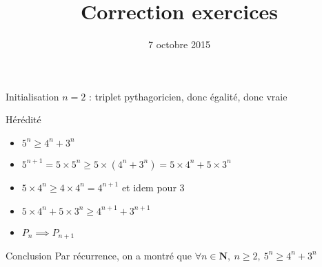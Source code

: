 \documentclass[12pt,french]{beamer}
\title{Correction exercices}
\date{7 octobre 2015}
\newcommand{\N}{\mathbf{N}}
\begin{document}
\begin{frame}
  \maketitle
\end{frame}

\begin{frame}
  \begin{block}{Initialisation}
    $n = 2$ : triplet pythagoricien, donc égalité, donc vraie
  \end{block}
  \begin{block}{Hérédité}
    \begin{itemize}
      \item $5^n \geqslant 4^n + 3^n$
      \item $5^{n+1} = 5\times 5^n \geqslant 5\times (4^n + 3^n) =
        5\times 4^n + 5\times 3^n$
      \item $5\times 4^n \geqslant 4\times 4^n = 4^{n+1}$ et idem pour 3
      \item $5\times 4^n + 5\times 3^n \geqslant 4^{n+1} + 3^{n+1}$
      \item $P_n \implies P_{n+1}$
    \end{itemize}
  \end{block}
  \begin{block}{Conclusion}
    Par récurrence, on a montré que $\forall n\in\N,\ n\geqslant 2,\ 5^n
    \geqslant 4^n + 3^n$
  \end{block}
\end{frame}
\end{document}
